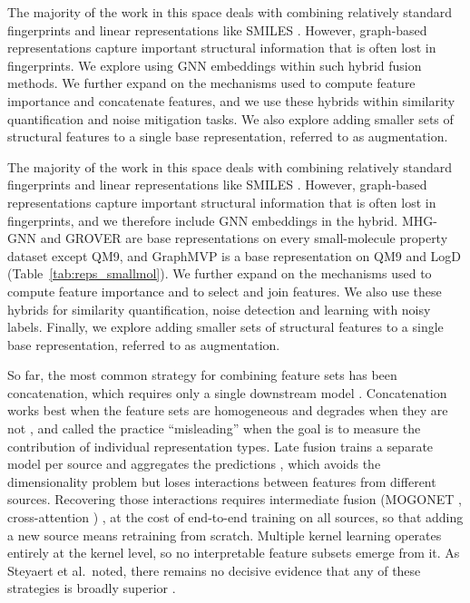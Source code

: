 The majority of the work in this space deals with combining relatively standard fingerprints and linear representations like SMILES \citep{Xie2020, Laufktter2019}. However, graph-based representations capture important structural information that is often lost in fingerprints. We explore using GNN embeddings within such hybrid fusion methods. We further expand on the mechanisms used to compute feature importance and concatenate features, and we use these hybrids within similarity quantification and noise mitigation tasks. We also explore adding smaller sets of structural features to a single base representation, referred to as augmentation. 

The majority of the work in this space deals with combining relatively standard fingerprints and linear representations like SMILES \citep{Xie2020, Laufktter2019}. However, graph-based representations capture important structural information that is often lost in fingerprints, and we therefore include GNN embeddings in the hybrid. MHG-GNN and GROVER are base representations on every small-molecule property dataset except QM9, and GraphMVP is a base representation on QM9 and LogD (Table~\ref{tab:reps_smallmol}). We further expand on the mechanisms used to compute feature importance and to select and join features. We also use these hybrids for similarity quantification, noise detection and learning with noisy labels. Finally, we explore adding smaller sets of structural features to a single base representation, referred to as augmentation.

So far, the most common strategy for combining feature sets has been concatenation, which requires only a single downstream model \citep{Stahlschmidt2022}. Concatenation works best when the feature sets are homogeneous and degrades when they are not \citep{Stahlschmidt2022}, and \citet{Deng2023} called the practice ``misleading'' when the goal is to measure the contribution of individual representation types. Late fusion trains a separate model per source and aggregates the predictions \citep{Steyaert2023}, which avoids the dimensionality problem but loses interactions between features from different sources. Recovering those interactions requires intermediate fusion (MOGONET \citep{Wang2021}, cross-attention \citep{Beaude2025}) %
, at the cost of end-to-end training on all sources, so that adding a new source means retraining from scratch. Multiple kernel learning \citep{Gonen2011} operates entirely at the kernel level, so no interpretable feature subsets emerge from it. As Steyaert et al.\ noted, there remains no decisive evidence that any of these strategies is broadly superior \citep{Steyaert2023}.

